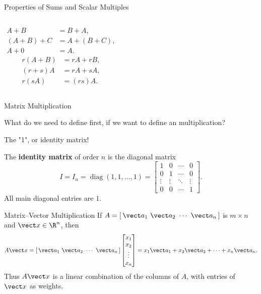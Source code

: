 \begin{frame}{Properties of Sums and Scalar Multiples}
\begin{columns}[T]
\begin{align*}
A+B&=B+A,\\
(A+B)+C&=A+(B+C),\\
A+0&=A.
\end{align*}
\begin{align*}
r(A+B)&=rA+rB,\\
(r+s)A&=rA+sA,\\
r(sA)&=(rs)A.
\end{align*}
\end{columns}
\end{frame}


\begin{frame}{Matrix Multiplication}

What do we need to define first, if we want to define an multiplication?\pause

The "1", or identity matrix!\pause

The \textbf{identity matrix} of order $n$ is the diagonal matrix
\[
I=I_n=\operatorname{diag}(1,1,\ldots,1)
=\begin{bmatrix}
1&0&\cdots&0\\
0&1&\cdots&0\\
\vdots&\vdots&\ddots&\vdots\\
0&0&\cdots&1
\end{bmatrix}.
\]
All main diagonal entries are $1$.
\end{frame}


\begin{frame}{Matrix--Vector Multiplication}
If $A=[\,\vect a_1\ \vect a_2\ \cdots\ \vect a_n\,]$ is $m\times n$ and $\vect x\in\R^n$, then
\[
A\vect x=
[\,\vect a_1\ \vect a_2\ \cdots\ \vect a_n\,]
\begin{bmatrix}x_1\\x_2\\\vdots\\x_n\end{bmatrix}
=x_1\vect a_1+x_2\vect a_2+\cdots+x_n\vect a_n.
\]
Thus $A\vect x$ is a linear combination of the columns of $A$, with entries of $\vect x$ as weights.
\end{frame}

